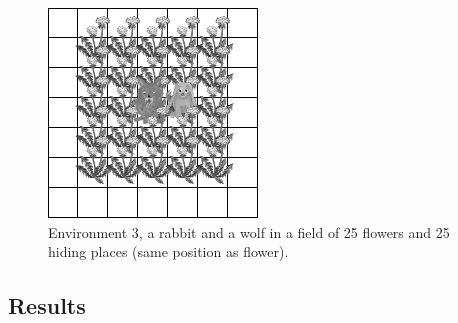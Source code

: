 \documentclass{aamas2012}
\begin{document}
	\begin{figure}
		\centering
		\includegraphics[keepaspectratio=true, scale=0.5]{environment_3.png}
		\caption
		{
			\label{environment_3}
			Environment 3, a rabbit and a wolf in a field of 25 flowers and 25 hiding places (same position as flower).
		}
	\end{figure}
	
\subsection{Results}
\end{document}
